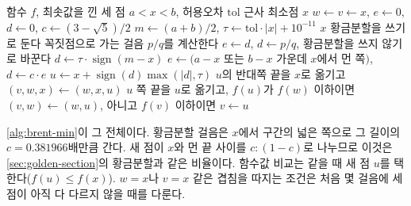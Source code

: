 \begin{algorithm}[t]
\begin{algorithmic}[1]
\Require 함수 $f$, 최솟값을 낀 세 점 $a<x<b$, 허용오차 $\mathrm{tol}$
\Ensure 근사 최소점 $x$
\State $w\gets v\gets x$, $e\gets0$, $d\gets0$, $c\gets(3-\sqrt5)/2$
\Loop
  \State $m\gets(a+b)/2$, $\tau\gets\mathrm{tol}\cdot|x|+10^{-11}$
   \Return $x$ \EndIf
  \State 황금분할을 쓰기로 둔다
   
    \State 꼭짓점으로 가는 걸음 $p/q$를 계산한다
      \State $e\gets d$, $d\gets p/q$, 황금분할을 쓰지 않기로 바꾼다
       $d\gets\tau\cdot\operatorname{sign}(m-x)$ \EndIf
    \EndIf
  \EndIf
    \State $e\gets(a-x$ 또는 $b-x$ 가운데 $x$에서 먼 쪽$)$, $d\gets c\cdot e$
  \EndIf
  \State $u\gets x+\operatorname{sign}(d)\max(|d|,\tau)$ 
    \State $u$의 반대쪽 끝을 $x$로 옮기고 $(v,w,x)\gets(w,x,u)$
  \Else
    \State $u$ 쪽 끝을 $u$로 옮기고, $f(u)$가 $f(w)$ 이하이면 $(v,w)\gets(w,u)$, 아니고 $f(v)$ 이하이면 $v\gets u$
  \EndIf
\EndLoop
\end{algorithmic}
\caption{Brent의 한 변수 최소화}
\label{alg:brent-min}
\end{algorithm}

\cref{alg:brent-min}이 그 전체이다. 황금분할 걸음은 $x$에서 구간의 넓은 쪽으로 그 길이의 $c=0.381966$배만큼 간다. 새 점이 $x$와 먼 끝 사이를 $c:(1-c)$로 나누므로 이것은 \cref{sec:golden-section}의 황금분할과 같은 비율이다. 함수값 비교는 같을 때 새 점 $u$를 택한다($f(u)\le f(x)$). $w=x$나 $v=x$ 같은 겹침을 따지는 조건은 처음 몇 걸음에 세 점이 아직 다 다르지 않을 때를 다룬다.

